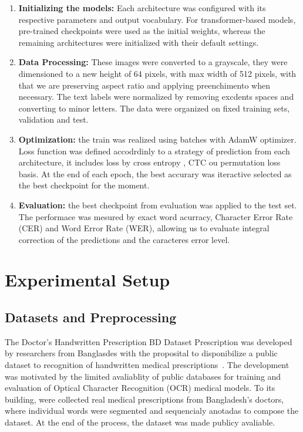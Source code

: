\documentclass[11pt,a4paper]{article}
\begin{document}
\begin{enumerate}
\item \textbf{Initializing the models:} Each architecture was configured with its respective parameters and output vocabulary. For transformer-based models, pre-trained checkpoints were used as the initial weights, whereas the remaining architectures were initialized with their default settings.


		\item \textbf{Data Processing:} These images were converted to a grayscale, they were dimensioned to a new height of 64 pixels, with max width of 512 pixels, with that we are preserving aspect ratio and applying preenchimento when necessary. The text labels were normalized by removing excdents spaces and converting to minor letters. The data were organized on fixed training sets, validation and test.

	\item \textbf{Optimization:} the train was realized  using batches with AdamW optimizer. Loss function was defined accodrdinly to a strategy of prediction from each architecture, it includes loss by cross entropy , CTC ou permutation loss basis. At the end of each epoch, the best accurary was iteractive selected as the best checkpoint for the moment.
	
	\item \textbf{Evaluation:} the best checkpoint from evaluation was applied to the test set. The performace was mesured by exact word acurracy, Character Error Rate (CER) and Word Error Rate (WER), allowing us to evaluate integral correction of the predictions and the caracteres error level.
	
	
\end{enumerate}

\section{Experimental Setup}
\label{sec:experiments}

\subsection{Datasets and Preprocessing}
\label{sec:datasets}


The Doctor's Handwritten Prescription BD Dataset Prescription was developed by researchers from Banglasdes with the proposital to disponibilize a public dataset to recognition of handwritten medical prescriptions~\cite{mia2024deep}. The development was motivated by the limited avaliablity of public databases for training and evaluation of Optical Character Recognition (OCR) medical models. To its building, were collected real medical prescriptions from Bangladesh's doctors, where individual words were segmented and sequencialy anotadas to compose the dataset. At the end of the process, the dataset was made publicy avaliable.
\end{document}
